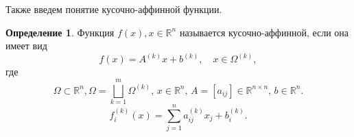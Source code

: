 \documentclass[envcountsect]{beamer}
\newtheorem{rustatement}{Утверждение}
\theoremstyle{definition}
\newtheorem{rudefinition}{Определение}[section]
\begin{document}

	
	\begin{frame}
		Также введем понятие кусочно-аффинной функции.
		\begin{rudefinition}
			Функция \(f(x), x \in \mathbb{R}^n\) называется кусочно-аффинной, если она имеет вид
			\begin{equation} \label{pwadef}
				f(x) = A^{(k)}x + b^{(k)},\quad x \in \Omega^{(k)},
			\end{equation}
			где
			\[\Omega \subset \mathbb{R}^n, \Omega = \bigsqcup_{k = 1}^m \Omega^{(k)},\, x \in \mathbb{R}^{n},\, A=[a_{ij}] \in \mathbb{R}^{n \times n},\, b \in \mathbb{R}^{n}.\]
			\[f_i^{(k)}(x) = \sum_{j=1}^{n} a_{ij}^{(k)}x_j + b_i^{(k)}.\]
		\end{rudefinition}
	\end{frame}
\end{document}
